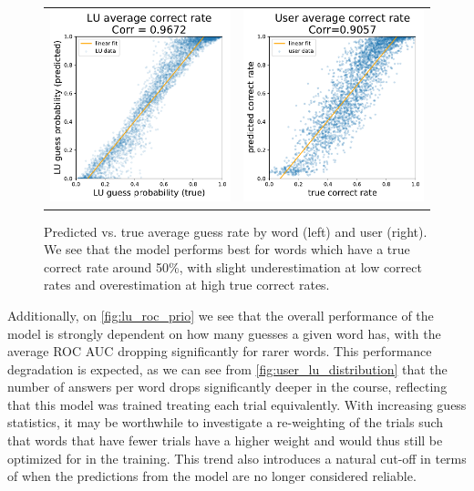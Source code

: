 \begin{figure}[ht]
\centering
\begin{tabular}{cc}
\includegraphics[width=0.4\linewidth]{figures/lingvist/lu_correct_rate.pdf} &
\includegraphics[width=0.4\linewidth]{figures/lingvist/user_correct_rate.pdf} \\
\end{tabular}
\caption{Predicted vs. true average guess rate by word (left) and user (right). We see that the model performs best for words which have a true correct rate around 50\%, with slight underestimation at low correct rates and overestimation at high true correct rates.}
\label{fig:user_lu_correct_rate}
\end{figure}

Additionally, on \cref{fig:lu_roc_prio} we see that the overall performance of the model is strongly dependent on how many guesses a given word has, with the average ROC AUC dropping significantly for rarer words. This performance degradation is expected, as we can see from \cref{fig:user_lu_distribution} that the number of answers per word drops significantly deeper in the course, reflecting that this model was trained treating each trial equivalently. With increasing guess statistics, it may be worthwhile to investigate a re-weighting of the trials such that words that have fewer trials have a higher weight and would thus still be optimized for in the training. This trend also introduces a natural cut-off in terms of when the predictions from the model are no longer considered reliable.

